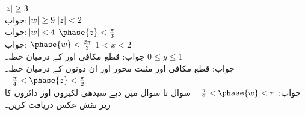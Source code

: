 \quad
$\abs{z}\ge 3$\\
جواب:\quad
$\abs{w}\ge 9$
\quad
$\abs{z}<2$\\
جواب:\quad
$\abs{w}<4$
\quad
$\phase{z}<\tfrac{\pi}{3}$\\
جواب:\quad
$\phase{w}<\tfrac{2\pi}{3}$
\quad
$1<x<2$\\
جواب:\quad
قطع مکافی  اور  کے درمیان خطہ۔
\quad
$0\le y\le 1$\\
جواب:\quad
قطع مکافی  اور مثبت محور    اور ان دونوں کے درمیان خطہ۔
\quad
$-\tfrac{\pi}{4}< \phase{z}<\tfrac{\pi}{2}$\\
جواب:\quad
$-\tfrac{\pi}{2}<\phase{w}<\pi$
سوال  تا سوال  میں دیے سیدھی لکیروں اور دائروں کا زیر نقش  عکس دریافت کریں۔
 
